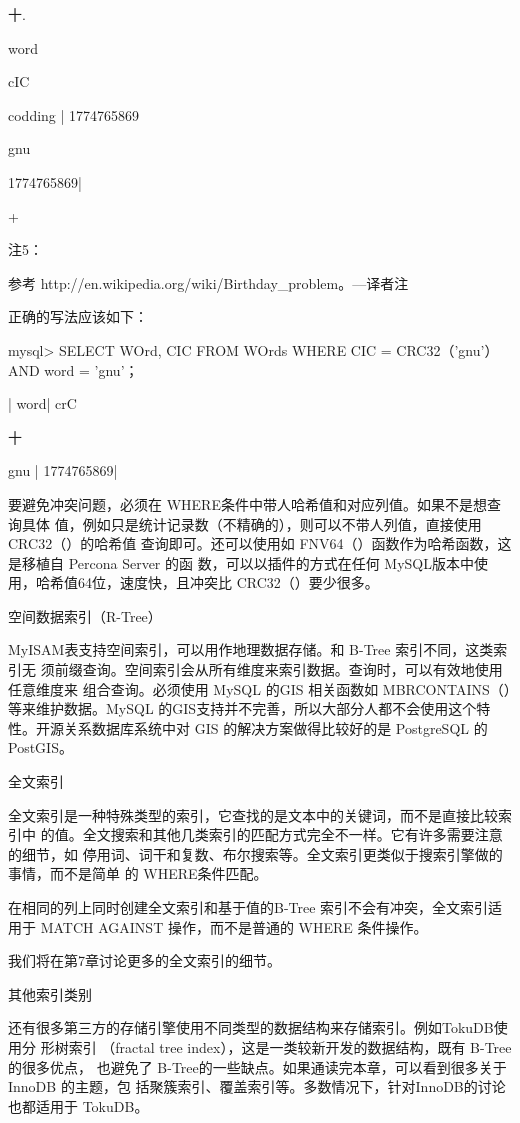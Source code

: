 十.

word

cIC

codding | 1774765869

gnu

1774765869|

+

注5：

参考 http://en.wikipedia.org/wiki/Birthday\_problem。—译者注

正确的写法应该如下：

mysql> SELECT WOrd, CIC FROM WOrds WHERE CIC = CRC32（'gnu'）AND word = 'gnu'；

| word| crC

十

gnu | 1774765869|

要避免冲突问题，必须在 WHERE条件中带人哈希值和对应列值。如果不是想查询具体
值，例如只是统计记录数（不精确的），则可以不带人列值，直接使用CRC32（）的哈希值
查询即可。还可以使用如 FNV64（）函数作为哈希函数，这是移植自 Percona Server 的函
数，可以以插件的方式在任何 MySQL版本中使用，哈希值64位，速度快，且冲突比
CRC32（）要少很多。

空间数据索引（R-Tree）

MyISAM表支持空间索引，可以用作地理数据存储。和 B-Tree 索引不同，这类索引无
须前缀查询。空间索引会从所有维度来索引数据。查询时，可以有效地使用任意维度来
组合查询。必须使用 MySQL 的GIS 相关函数如 MBRCONTAINS（）等来维护数据。MySQL
的GIS支持并不完善，所以大部分人都不会使用这个特性。开源关系数据库系统中对
GIS 的解决方案做得比较好的是 PostgreSQL 的 PostGIS。

全文索引

全文索引是一种特殊类型的索引，它查找的是文本中的关键词，而不是直接比较索引中
的值。全文搜索和其他几类索引的匹配方式完全不一样。它有许多需要注意的细节，如
停用词、词干和复数、布尔搜索等。全文索引更类似于搜索引擎做的事情，而不是简单
的 WHERE条件匹配。

在相同的列上同时创建全文索引和基于值的B-Tree 索引不会有冲突，全文索引适用于
MATCH AGAINST 操作，而不是普通的 WHERE 条件操作。

我们将在第7章讨论更多的全文索引的细节。

其他索引类别

还有很多第三方的存储引擎使用不同类型的数据结构来存储索引。例如TokuDB使用分
形树索引 （fractal tree index），这是一类较新开发的数据结构，既有 B-Tree 的很多优点，
也避免了 B-Tree的一些缺点。如果通读完本章，可以看到很多关于 InnoDB 的主题，包
括聚簇索引、覆盖索引等。多数情况下，针对InnoDB的讨论也都适用于 TokuDB。


